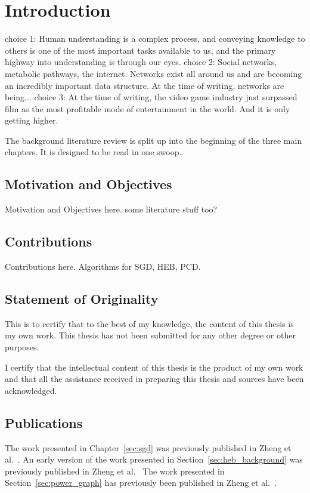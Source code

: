 \chapter{Introduction}
choice 1: Human understanding is a complex process, and conveying knowledge to others is one of the most important tasks available to us, and the primary highway into understanding is through our eyes.
choice 2: Social networks, metabolic pathways, the internet. Networks exist all around us and are becoming an incredibly important data structure. At the time of writing, networks are being...
choice 3: At the time of writing, the video game industry just surpassed film as the most profitable mode of entertainment in the world. And it is only getting higher.

The background literature review is split up into the beginning of the three main chapters. It is designed to be read in one swoop.

\section{Motivation and Objectives}

Motivation and Objectives here.
some literature stuff too?

\section{Contributions}

Contributions here.
Algorithms for SGD, HEB, PCD.


\section{Statement of Originality}
This is to certify that to the best of my knowledge, the content of this thesis is my own work. This thesis has not been submitted for any other degree or other purposes.

I certify that the intellectual content of this thesis is the product of my own work and that all the assistance received in preparing this thesis and sources have been acknowledged.

\section{Publications}

The work presented in Chapter~\ref{sec:sgd} was previously published in Zheng et al.\ \cite{Zheng2019Stochastic}.
An early version of the work presented in Section~\ref{sec:heb_background} was previously published in Zheng et al.\ \cite{Zheng2018}
The work presented in Section~\ref{sec:power_graph} has previously been published in Zheng et al.\ \cite{Zheng2019Power}.